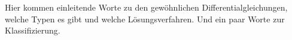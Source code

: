 Hier kommen einleitende Worte zu den gewöhnlichen Differentialgleichungen, welche Typen es gibt und welche Lösungsverfahren. Und ein paar Worte zur Klassifizierung.